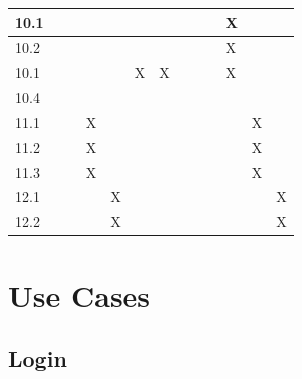 \documentclass[12pt]{article}
\begin{document}
\begin{tabular}{ |p{0.2cm}|p{0.1cm}|p{0.5cm}|p{0.1cm}|p{0.1cm}|p{0.1cm}|p{0.1cm}|p{0.1cm}|p{0.1cm}|p{0.1cm}|p{0.1cm}|p{0.1cm}|p{0.1cm}|  }
 \hline

 10.1&  &   &   &   &   &   &   &   &   &  X &   &\\

 \hline

 10.2&  &   &   &   &   &   &   &   &   & X  &   &\\

 \hline

 10.1&  &   &   &   &  X & X  &   &   &   &  X &   &\\

 \hline

 10.4&  &   &   &   &   &   &   &   &   &   &   &\\

 \hline

 11.1&  &   &X   &   &   &   &   &   &   &   & X  &\\

 \hline

 11.2&  &   &X   &   &   &   &   &   &   &   & X  &\\

 \hline

 11.3&  &   &X   &   &   &   &   &   &   &   & X  &\\

 \hline

 12.1&  &   &   &X   &   &   &   &   &   &   &   &X\\

 \hline

 12.2&  &   &   & X  &   &   &   &   &   &   &   &X\\

 \hline

  \end{tabular}


\section{Use Cases}
	
	\subsection{Login}
	
\end{document}
